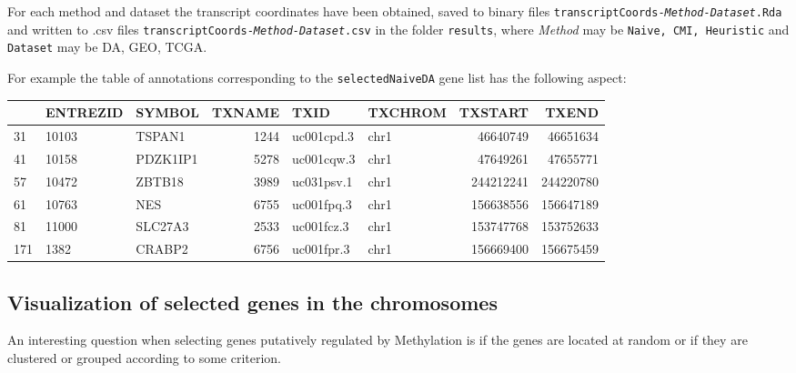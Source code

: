 \documentclass[a4paper,10pt]{article}\usepackage[]{graphicx}\usepackage[]{color}
\newenvironment{knitrout}{}{} %
\begin{document}
For each method and dataset the transcript coordinates have been obtained, saved to binary files \texttt{transcriptCoords-\emph{Method-Dataset}.Rda} and written to .csv files \texttt{transcriptCoords-\emph{Method-Dataset}.csv} in the folder \texttt{results}, where \emph{Method} may be \texttt{Naive, CMI, Heuristic} and \texttt{Dataset} may be {DA, GEO, TCGA}.



For example the table of annotations corresponding to the \texttt{selectedNaiveDA} gene list has the following aspect:

\begin{knitrout}
\color{fgcolor}


\begin{tabular}{l|l|l|r|l|l|r|r}
\hline
  & ENTREZID & SYMBOL & TXNAME & TXID & TXCHROM & TXSTART & TXEND\\
\hline
31 & 10103 & TSPAN1 & 1244 & uc001cpd.3 & chr1 & 46640749 & 46651634\\
\hline
41 & 10158 & PDZK1IP1 & 5278 & uc001cqw.3 & chr1 & 47649261 & 47655771\\
\hline
57 & 10472 & ZBTB18 & 3989 & uc031psv.1 & chr1 & 244212241 & 244220780\\
\hline
61 & 10763 & NES & 6755 & uc001fpq.3 & chr1 & 156638556 & 156647189\\
\hline
81 & 11000 & SLC27A3 & 2533 & uc001fcz.3 & chr1 & 153747768 & 153752633\\
\hline
171 & 1382 & CRABP2 & 6756 & uc001fpr.3 & chr1 & 156669400 & 156675459\\
\hline
\end{tabular}
\end{knitrout}


\subsection{Visualization of selected genes in the chromosomes}


An interesting question when selecting genes putatively regulated by Methylation is if the genes are located at random or if they are clustered or grouped according to some criterion.
\end{document}
